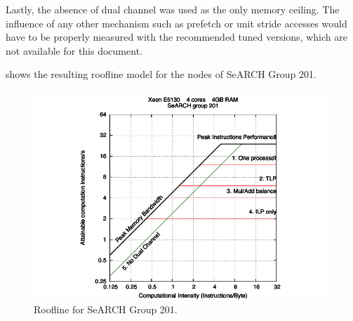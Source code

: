 Lastly, the absence of dual channel was used as the only memory ceiling. The influence of any other mechanism such as prefetch or unit stride accesses would have to be properly measured with the recommended tuned versions, which are not available for this document.

 shows the resulting roofline model for the nodes of SeARCH Group 201.

\begin{figure}[!htp]
	\begin{center}
		\includegraphics[width=\columnwidth]{images/roofline201.pdf}
	\end{center}
	\caption{Roofline for SeARCH Group 201.}
	\label{fig:roofline}
\end{figure}
